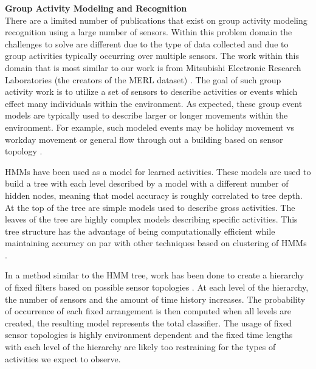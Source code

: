 \bigskip
\noindent \textbf{Group Activity Modeling and Recognition} \\
There are a limited number of publications that exist on group activity modeling recognition using a large number of sensors.  Within this problem domain the challenges to solve are different due to the type of data collected and due to group activities typically occurring over multiple sensors.  The work within this domain that is most similar to our work is from Mitsubishi Electronic Research Laboratories (the creators of the MERL dataset) \cite{Wren2003, Wren2006a}.  The goal of such group activity work is to utilize a set of sensors to describe activities or events which effect many individuals within the environment.  As expected, these group event models are typically used to describe larger or longer movements within the environment.  For example, such modeled events may be holiday movement vs workday movement or general flow through out a building based on sensor topology \cite{Wren2006, Hoff2009}.  
	
HMMs have been used as a model for learned activities.  These models are used to build a tree \cite{Minnen2004, Wren2006a} with each level described by a model with a different number of hidden nodes, meaning that model accuracy is roughly correlated to tree depth.  At the top of the tree are simple models used to describe gross activities.  The leaves of the tree are highly complex models describing specific activities.  This tree structure has the advantage of being computationally efficient while maintaining accuracy on par with other techniques based on clustering of HMMs \cite{Clarkson1999}.  
	
In a method similar to the HMM tree, work has been done to create a hierarchy of fixed filters based on possible sensor topologies \cite{Wren2006}.  At each level of the hierarchy, the number of sensors and the amount of time history increases.  The probability of occurrence of each fixed arrangement is then computed when all levels are created, the resulting model represents the total classifier.  The usage of fixed sensor topologies is highly environment dependent and the fixed time lengths with each level of the hierarchy are likely too restraining for the types of activities we expect to observe.  

